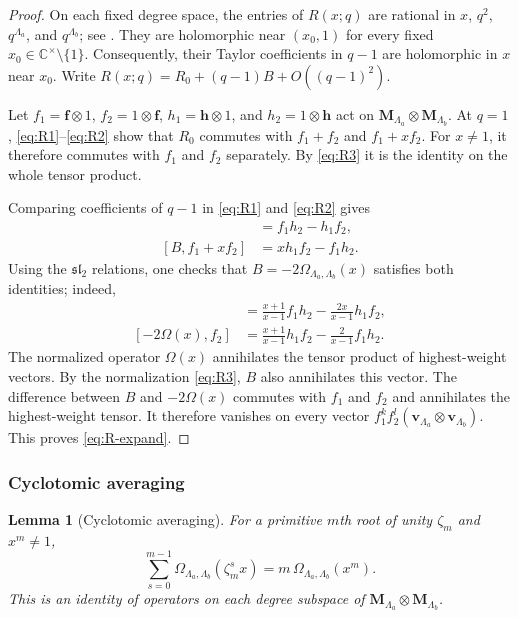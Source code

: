 \documentclass[12pt]{amsart}
\let\frak\mathfrak
\newtheorem{lem}[thm]{Lemma}
\theoremstyle{definition}
\numberwithin{equation}{section}
\theoremstyle{definition}
\let\La\Lambda
\let\Om\Omega
\let\ox\otimes
\def\C{{\mathbb C}}
\def\beq{\begin{equation}}
\def\eeq{\end{equation}}
\def\slt{{\frak{sl}_2}}
\begin{document}
\begin{proof}
On each fixed degree space, the entries of $R(x;q)$ are
rational in $x$, $q^2$, $q^{\La_a}$, and $q^{\La_b}$;
see \cite[Section~3]{TV97}.  They are holomorphic near
$(x_0,1)$ for every fixed $x_0\in\C^\times\setminus\{1\}$.
Consequently, their Taylor coefficients in $q-1$ are
holomorphic in $x$ near $x_0$.  Write
$R(x;q)=R_0+(q-1)B+O((q-1)^2)$.

Let $f_1=\mathbf f\ox1$, $f_2=1\ox\mathbf f$,
$h_1=\mathbf h\ox1$, and $h_2=1\ox\mathbf h$
act on $\mathbf M_{\La_a}\ox\mathbf M_{\La_b}$.
At $q=1$, \eqref{eq:R1}--\eqref{eq:R2} show that
$R_0$ commutes with $f_1+f_2$ and $f_1+xf_2$.
For $x\ne1$, it therefore commutes with $f_1$ and $f_2$
separately.  By \eqref{eq:R3} it is the identity on the
whole tensor product.

Comparing coefficients of $q-1$ in \eqref{eq:R1} and
\eqref{eq:R2} gives
\begin{align}
 [B,f_1+f_2]&=f_1h_2-h_1f_2,\label{eq:comm1}\\
 [B,f_1+xf_2]&=xh_1f_2-f_1h_2.\label{eq:comm2}
\end{align}
Using the $\slt$ relations, one checks that
$B=-2\Om_{\La_a,\La_b}(x)$ satisfies both identities; indeed,
\begin{align*}
 [-2\Om(x),f_1]
 &=\frac{x+1}{x-1}f_1h_2-\frac{2x}{x-1}h_1f_2,\\
 [-2\Om(x),f_2]
 &=\frac{x+1}{x-1}h_1f_2-\frac{2}{x-1}f_1h_2.
\end{align*}
The normalized operator $\Om(x)$ annihilates the tensor
product of highest-weight vectors.  By the normalization
\eqref{eq:R3}, $B$ also annihilates this vector.
The difference between $B$ and $-2\Om(x)$ commutes with
$f_1$ and $f_2$ and annihilates the highest-weight tensor.  It therefore vanishes
on every vector
$f_1^k f_2^l(\mathbf v_{\La_a}\ox\mathbf v_{\La_b})$.
This proves \eqref{eq:R-expand}.
\end{proof}

\subsubsection{Cyclotomic averaging}

\begin{lem}[Cyclotomic averaging]\label{lem:average}
For a primitive $m$th root of unity $\zeta_m$ and $x^m\ne1$,
\beq\label{eq:averaging}
 \boxed{\quad
 \sum_{s=0}^{m-1}\Om_{\La_a,\La_b}(\zeta_m^s x)
 =m\,\Om_{\La_a,\La_b}(x^m).
 \quad}
\eeq
This is an identity of operators on each degree subspace of
$\mathbf M_{\La_a}\ox\mathbf M_{\La_b}$.
\end{lem}
\end{document}
